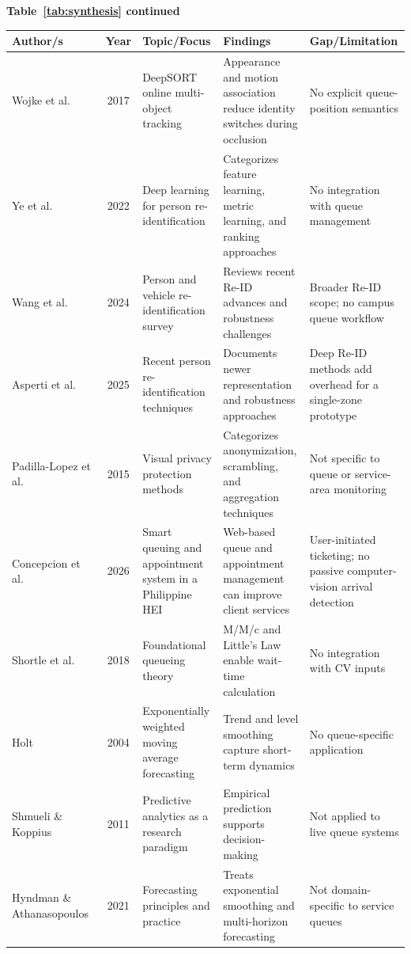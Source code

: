 \documentclass{research}
\begin{document}
\begin{center}
\scriptsize
\setlength{\tabcolsep}{3pt}
\renewcommand{\arraystretch}{1.02}
\textbf{Table~\ref{tab:synthesis} continued}\\[0.2em]
\begin{tabular}{p{2.7cm} c p{3.0cm} p{3.3cm} p{3.7cm}}
  \toprule
  \textbf{Author/s} & \textbf{Year} & \textbf{Topic/Focus} &
  \textbf{Findings} & \textbf{Gap/Limitation} \\
  \midrule
    Wojke et al.~\cite{wojke2017deepsort} & 2017 &
      DeepSORT online multi-object tracking &
      Appearance and motion association reduce identity switches during occlusion &
      No explicit queue-position semantics \\[0.3em]
    Ye et al.~\cite{ye2022reid} & 2022 &
      Deep learning for person re-identification &
      Categorizes feature learning, metric learning, and ranking approaches &
      No integration with queue management \\[0.3em]
    Wang et al.~\cite{wang2024reid} & 2024 &
      Person and vehicle re-identification survey &
      Reviews recent Re-ID advances and robustness challenges &
      Broader Re-ID scope; no campus queue workflow \\[0.3em]
    Asperti et al.~\cite{asperti2025reid} & 2025 &
      Recent person re-identification techniques &
      Documents newer representation and robustness approaches &
      Deep Re-ID methods add overhead for a single-zone prototype \\[0.3em]
    Padilla-Lopez et al.~\cite{padillalopez2015privacy} & 2015 &
      Visual privacy protection methods &
      Categorizes anonymization, scrambling, and aggregation techniques &
      Not specific to queue or service-area monitoring \\[0.3em]
    Concepcion et al.~\cite{concepcion2026smart} & 2026 &
      Smart queuing and appointment system in a Philippine HEI &
      Web-based queue and appointment management can improve client services &
      User-initiated ticketing; no passive computer-vision arrival detection \\[0.3em]
    Shortle et al.~\cite{shortle2018fundamentals} & 2018 &
      Foundational queueing theory &
      M/M/c and Little's Law enable wait-time calculation &
      No integration with CV inputs \\[0.3em]
    Holt~\cite{holt2004forecasting} & 2004 &
      Exponentially weighted moving average forecasting &
      Trend and level smoothing capture short-term dynamics &
      No queue-specific application \\[0.3em]
    Shmueli \& Koppius~\cite{shmueli2011predictive} & 2011 &
      Predictive analytics as a research paradigm &
      Empirical prediction supports decision-making &
      Not applied to live queue systems \\[0.3em]
    Hyndman \& Athanasopoulos~\cite{hyndman2021forecasting} & 2021 &
      Forecasting principles and practice &
      Treats exponential smoothing and multi-horizon forecasting &
      Not domain-specific to service queues \\
  \bottomrule
\end{tabular}
\end{center}
\end{document}
